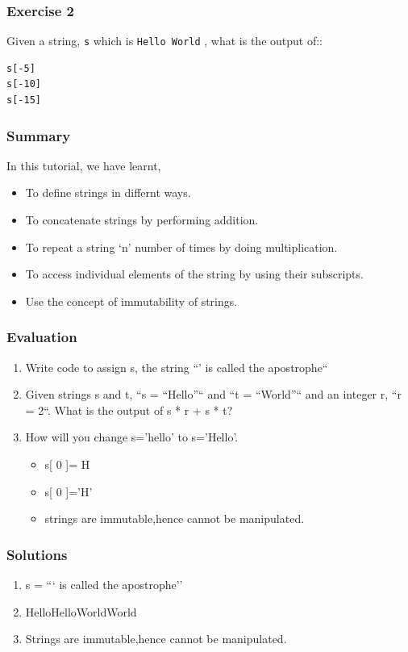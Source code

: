 \documentclass[presentation]{beamer}
\begin{document}
\begin{frame}[fragile]
\frametitle{Exercise 2}
\label{sec-4}

  Given a string, \verb~s~ which is \verb~Hello World~ , what is the output of::
\lstset{language=Python}
\begin{lstlisting}
s[-5] 
s[-10]
s[-15]
\end{lstlisting}
\end{frame}
\begin{frame}
\frametitle{Summary}
\label{sec-5}

  In this tutorial, we have learnt,

\begin{itemize}
\item To define strings in differnt ways.
\item To concatenate strings by performing addition.
\item To repeat a string `n' number of times by doing multiplication.
\item To access individual elements of the string by using their subscripts.
\item Use the concept of immutability of strings.
\end{itemize}
\end{frame}
\begin{frame}
\frametitle{Evaluation}
\label{sec-6}


\begin{enumerate}
\item Write code to assign s, the string ``' is called the apostrophe``
\vspace{8pt}
\item Given strings s and t, ``s = ``Hello''`` and ``t = ``World''`` and an
   integer r, ``r = 2``. What is the output of s * r + s * t?
\vspace{8pt}   
\item How will you change s='hello' to s='Hello'.
\begin{itemize}
\item s[ 0 ]= H
\item s[ 0 ]='H'
\item strings are immutable,hence cannot be manipulated.
\end{itemize}
\end{enumerate}
\end{frame}
\begin{frame}
\frametitle{Solutions}
\label{sec-7}


\begin{enumerate}
\item s = ``` is called the apostrophe''
\vspace{8pt}
\item HelloHelloWorldWorld
\vspace{8pt}
\item Strings are immutable,hence cannot be manipulated.
\end{enumerate}
\end{frame}
\end{document}
